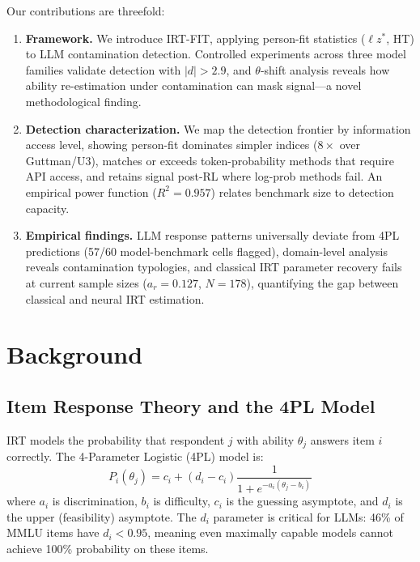 \documentclass[11pt,twocolumn]{article}
\newcommand{\lzs}{\ensuremath{\ell z^*}}
\begin{document}
Our contributions are threefold:
\begin{enumerate}
\item \textbf{Framework.} We introduce IRT-FIT, applying person-fit statistics ($\lzs$, HT) to LLM contamination detection. Controlled experiments across three model families validate detection with $|d| > 2.9$, and $\theta$-shift analysis reveals how ability re-estimation under contamination can mask signal---a novel methodological finding.
\item \textbf{Detection characterization.} We map the detection frontier by information access level, showing person-fit dominates simpler indices ($8\times$ over Guttman/U3), matches or exceeds token-probability methods that require API access, and retains signal post-RL where log-prob methods fail. An empirical power function ($R^2 = 0.957$) relates benchmark size to detection capacity.
\item \textbf{Empirical findings.} LLM response patterns universally deviate from 4PL predictions (57/60 model-benchmark cells flagged), domain-level analysis reveals contamination typologies, and classical IRT parameter recovery fails at current sample sizes ($a_r = 0.127$, $N = 178$), quantifying the gap between classical and neural IRT estimation.
\end{enumerate}

\section{Background}

\subsection{Item Response Theory and the 4PL Model}

IRT models the probability that respondent $j$ with ability $\theta_j$ answers item $i$ correctly. The 4-Parameter Logistic (4PL) model is:
\begin{equation}
P_i(\theta_j) = c_i + (d_i - c_i) \frac{1}{1 + e^{-a_i(\theta_j - b_i)}}
\end{equation}
where $a_i$ is discrimination, $b_i$ is difficulty, $c_i$ is the guessing asymptote, and $d_i$ is the upper (feasibility) asymptote. The $d_i$ parameter is critical for LLMs: 46\% of MMLU items have $d_i < 0.95$, meaning even maximally capable models cannot achieve 100\% probability on these items.
\end{document}
